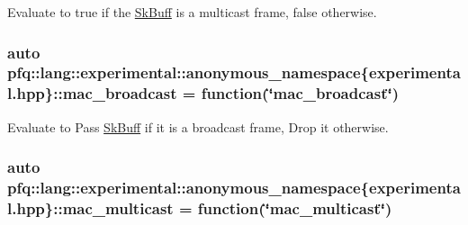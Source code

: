 Evaluate to {\ttfamily true} if the \hyperlink{structpfq_1_1lang_1_1SkBuff}{Sk\+Buff} is a multicast frame, {\ttfamily false} otherwise. 

\subsubsection[{\texorpdfstring{mac\+\_\+broadcast}{mac_broadcast}}]{\setlength{\rightskip}{0pt plus 5cm}auto pfq\+::lang\+::experimental\+::anonymous\+\_\+namespace\{experimental.\+hpp\}\+::mac\+\_\+broadcast = {\bf function}(\char`\"{}mac\+\_\+broadcast\char`\"{})}\hypertarget{namespacepfq_1_1lang_1_1experimental_1_1anonymous__namespace_02experimental_8hpp_03_aa889cbcf0c306d992508759fc5e677cd}{}\label{namespacepfq_1_1lang_1_1experimental_1_1anonymous__namespace_02experimental_8hpp_03_aa889cbcf0c306d992508759fc5e677cd}


Evaluate to {\ttfamily Pass} \hyperlink{structpfq_1_1lang_1_1SkBuff}{Sk\+Buff} if it is a broadcast frame, {\ttfamily Drop} it otherwise. 

\subsubsection[{\texorpdfstring{mac\+\_\+multicast}{mac_multicast}}]{\setlength{\rightskip}{0pt plus 5cm}auto pfq\+::lang\+::experimental\+::anonymous\+\_\+namespace\{experimental.\+hpp\}\+::mac\+\_\+multicast = {\bf function}(\char`\"{}mac\+\_\+multicast\char`\"{})}\hypertarget{namespacepfq_1_1lang_1_1experimental_1_1anonymous__namespace_02experimental_8hpp_03_a0c39849f9e3e8677342842f88a8ee37c}{}\label{namespacepfq_1_1lang_1_1experimental_1_1anonymous__namespace_02experimental_8hpp_03_a0c39849f9e3e8677342842f88a8ee37c}


